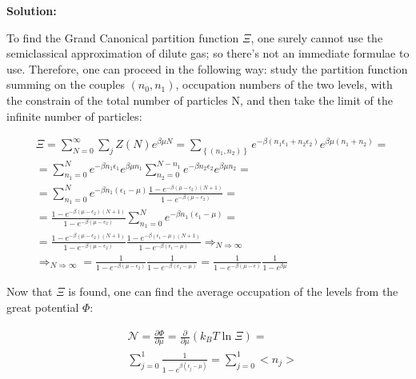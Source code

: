 \documentclass{article}
\begin{document}
\textbf{Solution:}

To find the Grand Canonical partition function $\Xi$, one surely cannot use the semiclassical approximation
of dilute gas; so there's not an immediate formulae to use.
Therefore, one can proceed in the following way: study the partition function
summing on the couples $(n_0, n_1)$, occupation numbers of the two levels, with the constrain
of the total number of particles N, and then take the limit of the infinite number of particles:

\begin{equation}
    \begin{aligned}
         & \Xi=\sum_{N=0}^{\infty}\sum_{j}Z(N)e^{\beta\mu N}=\sum_{\left\{ (n_1,n_2) \right\}} e^{-\beta(n_1\epsilon_1+n_2\epsilon_2)}e^{\beta\mu(n_1+n_2)}=                                     \\
         & =\sum_{n_1=0}^{N}e^{-\beta n_1\epsilon_1}e^{\beta\mu n_1}\sum_{n_2=0}^{N-n_1}e^{-\beta n_2\epsilon_2}e^{\beta\mu n_2}=                                                                \\
         & =\sum_{n_1=0}^{N}e^{-\beta n_1 (\epsilon_1-\mu)}\frac{1-e^{-\beta(\mu-\epsilon_2)(N+1)}}{1-e^{-\beta(\mu-\epsilon_2)}}=                                                               \\
         & =\frac{1-e^{-\beta(\mu-\epsilon_2)(N+1)}}{1-e^{-\beta(\mu-\epsilon_2)}}\sum_{n_1=0}^{N}e^{-\beta n_1 (\epsilon_1-\mu)}=                                                               \\
         & =\frac{1-e^{-\beta(\mu-\epsilon_2)(N+1)}}{1-e^{-\beta(\mu-\epsilon_2)}}\frac{1-e^{-\beta(\epsilon_1-\mu)(N+1)}}{1-e^{-\beta(\epsilon_1-\mu)}}\Longrightarrow_{N\Longrightarrow\infty} \\
         & \Longrightarrow_{N\Longrightarrow\infty}=\frac{1}{1-e^{-\beta(\mu-\epsilon_2)}}\frac{1}{1-e^{-\beta(\epsilon_1-\mu)}}= \frac{1}{1-e^{-\beta(\mu-\epsilon)}}\frac{1}{1-e^{\beta\mu}}
    \end{aligned}
\end{equation}

Now that $\Xi$ is found, one can find the average occupation of the levels from the great potential $\Phi$:

\begin{equation}
    \begin{aligned}
         & \mathcal{N}= \frac{\partial \Phi}{\partial \mu}= \frac{\partial}{\partial \mu}\left(k_B T \ln{\Xi}\right)= \\
         & \sum_{j=0}^{1}\frac{1}{1-e^{\beta(\epsilon_j-\mu)}}= \sum_{j=0}^{1} <n_j>
    \end{aligned}
\end{equation}
\end{document}
